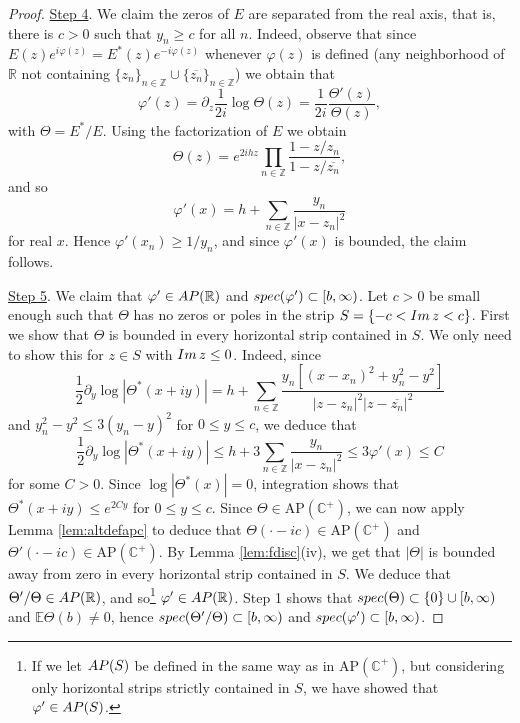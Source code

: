 \documentclass[a4paper,reqno,12pt]{amsart}
\newcommand{\E}{\mathcal{E}}
\renewcommand{\H}{\mathbb{C}^+}
\newcommand{\z}{\mathbb{Z}}
\renewcommand{\r}{\mathbb{R}}
\newcommand{\im}{{\rm Im}\,}
\newcommand{\p}{\varphi}
\newcommand{\1}{{\bf 1}}
\newcommand{\apc}{\mathrm{AP}(\H)}
\renewcommand{\E}{\mathbb{E}}
\newcommand{\ov}[1]{\overline{#1}}
\newcommand{\apr}{{\rm AP}(\r)}
\renewcommand{\1}{{\bo 1}}
\newcommand{\spec}{{\rm spec}}
\begin{document}
\begin{proof}
\underline{Step 4}. We claim the zeros of $E$ are separated from the real axis, that is, there is $c>0$ such that $y_n\geq c$ for all $n$. Indeed, observe that  since $E(z)e^{i\p(z)}=E^*(z)e^{-i\p(z)}$ whenever $\p(z)$ is defined (any neighborhood of $\r$ not containing $\{z_n\}_{n\in\z}\cup \{\ov{z_n}\}_{n\in \z}$) we obtain that
$$
\p'(z) = \partial_z \frac{1}{2i} \log \Theta(z) =  \frac{1}{2i} \frac{\Theta'(z)}{\Theta(z)},
$$
with $\Theta=E^*/E$. Using the factorization of $E$ we obtain
$$
\Theta(z) = e^{2i h z}\prod_{n\in \z} \frac{1-z/z_n}{1-z/\ov{z_n}},
$$
and so
$$
\p'(x) = h +  \sum_{n\in \z} \frac{y_n}{|x-z_n|^2}
$$
for real $x$. Hence $\p'(x_n) \geq 1/y_n$, and since $\p'(x)$ is bounded, the claim follows.

\underline{Step 5}. We claim that $\p'\in \apr$ and $\spec(\p')\subset [b,\infty)$. Let $c>0$ be small enough such that $\Theta$ has no zeros or poles in the strip $S=\{-c<\im z <c\}$.  First we show that $\Theta$ is bounded in every horizontal strip contained  in $S$. We only need to show this for $z\in S$ with $\im z\leq 0$. Indeed, since
$$
\frac12 \partial_y \log |\Theta^*(x+iy)|  =   h + \sum_{n\in\z}\frac{y_n[(x-x_n)^2+y_n^2-y^2]}{|z-z_n|^2|z-\ov{z_n}|^2}
$$
and $y_n^2-y^2\leq 3(y_n-y)^2$ for $0\leq y\leq c$, we deduce that
$$
\frac12 \partial_y \log |\Theta^*(x+iy)| \leq h + 3\sum_{n\in \z} \frac{y_n}{|x-z_n|^2} \leq 3\p'(x) \leq C
$$
for some $C>0$.  Since $\log |\Theta^*(x)|=0$, integration shows that $\Theta^*(x+iy)\leq e^{2Cy}$ for $0\leq y\leq c$. Since $\Theta\in \apc$, we can now apply Lemma \ref{lem:altdefapc} to deduce that $\Theta(\cdot-ic)\in \apc$ and $\Theta'(\cdot-ic)\in \apc$. By Lemma \ref{lem:fdisc}(iv), we get that $|\Theta|$ is bounded away from zero in every horizontal strip contained in $S$. We deduce that $\Theta'/\Theta\in \apr$, and so\footnote{If we let ${\rm AP}(S)$ be defined in the same way as in $\apc$, but considering only horizontal strips strictly contained in $S$, we have showed that $\p'\in {\rm AP}(S)$.} $\p'\in \apr$. Step 1 shows that $\spec(\Theta) \subset \{0\}\cup [b,\infty)$ and $\E \Theta(b)\neq 0$, hence $\spec(\Theta'/\Theta)\subset [b,\infty)$ and $\spec(\p')\subset [b,\infty)$.


\end{proof}
\end{document}
